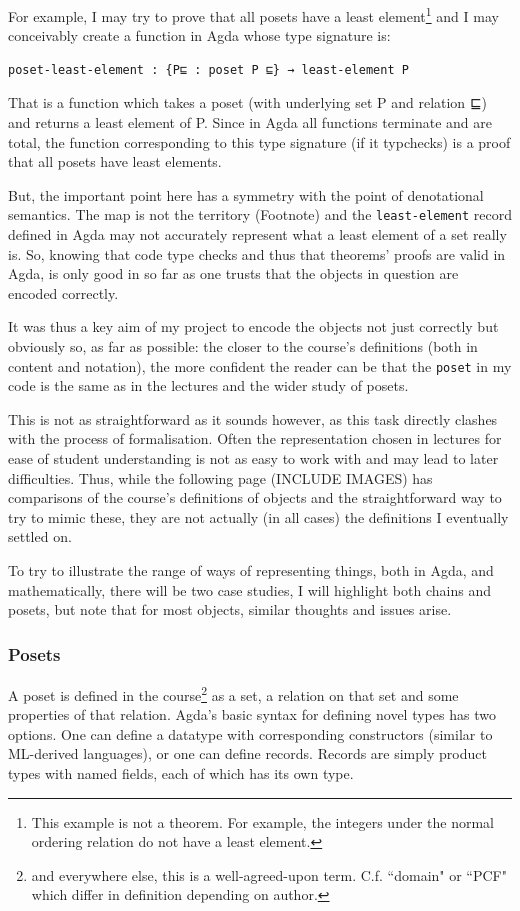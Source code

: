 \documentclass[12pt,a4paper,twoside,openright]{report}
\begin{document}
For example, I may try to prove that all posets have a least element\footnote{This example is not a theorem. For example, the integers under the normal ordering relation do not have a least element.} and I may conceivably create a function in Agda whose type signature is:
\begin{verbatim}
poset-least-element : {P⊑ : poset P ⊑} → least-element P
\end{verbatim}
That is a function which takes a poset (with underlying set P and relation ⊑) and returns a least element of P. Since in Agda all functions terminate and are total, the function corresponding to this type signature (if it typchecks) is a proof that all posets have least elements.

But, the important point here has a symmetry with the point of denotational semantics. The map is not the territory (Footnote) and the \texttt{least-element} record defined in Agda may not accurately represent what a least element of a set really is. So, knowing that code type checks and thus that theorems' proofs are valid in Agda, is only good in so far as one trusts that the objects in question are encoded correctly. 

It was thus a key aim of my project to encode the objects not just correctly but obviously so, as far as possible: the closer to the course's definitions (both in content and notation), the more confident the reader can be that the \texttt{poset} in my code is the same as in the lectures and the wider study of posets. 

This is not as straightforward as it sounds however, as this task directly clashes with the process of formalisation. Often the representation chosen in lectures for ease of student understanding is not as easy to work with and may lead to later difficulties. Thus, while the following page (INCLUDE IMAGES) has comparisons of the course's definitions of objects and the straightforward way to try to mimic these, they are not actually (in all cases) the definitions I eventually settled on. 

To try to illustrate the range of ways of representing things, both in Agda, and mathematically, there will be two case studies, I will highlight both chains and posets, but note that for most objects, similar thoughts and issues arise. 
\subsubsection{Posets}
A poset is defined in the course\footnote{and everywhere else, this is a well-agreed-upon term. C.f. ``domain" or ``PCF" which differ in definition depending on author.} as a set, a relation on that set and some properties of that relation. Agda's basic syntax for defining novel types has two options. One can define a datatype with corresponding constructors (similar to ML-derived languages), or one can define records. Records are simply product types with named fields, each of which has its own type. 
\end{document}
